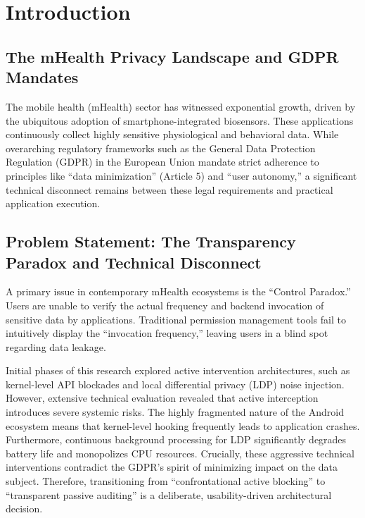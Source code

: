\section{Introduction}

\subsection{The mHealth Privacy Landscape and GDPR Mandates}
The mobile health (mHealth) sector has witnessed exponential growth, driven by the ubiquitous adoption of smartphone-integrated biosensors. These applications continuously collect highly sensitive physiological and behavioral data. While overarching regulatory frameworks such as the General Data Protection Regulation (GDPR) in the European Union mandate strict adherence to principles like ``data minimization'' (Article 5) and ``user autonomy,'' a significant technical disconnect remains between these legal requirements and practical application execution. 

\subsection{Problem Statement: The Transparency Paradox and Technical Disconnect}
A primary issue in contemporary mHealth ecosystems is the ``Control Paradox.'' Users are unable to verify the actual frequency and backend invocation of sensitive data by applications. Traditional permission management tools fail to intuitively display the ``invocation frequency,'' leaving users in a blind spot regarding data leakage.

Initial phases of this research explored active intervention architectures, such as kernel-level API blockades and local differential privacy (LDP) noise injection. However, extensive technical evaluation revealed that active interception introduces severe systemic risks. The highly fragmented nature of the Android ecosystem means that kernel-level hooking frequently leads to application crashes. Furthermore, continuous background processing for LDP significantly degrades battery life and monopolizes CPU resources. Crucially, these aggressive technical interventions contradict the GDPR's spirit of minimizing impact on the data subject. Therefore, transitioning from ``confrontational active blocking'' to ``transparent passive auditing'' is a deliberate, usability-driven architectural decision.

